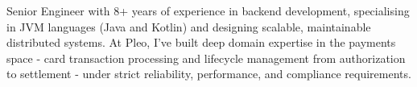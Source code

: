 

\begin{cvparagraph}
	
	Senior Engineer with 8+ years of experience in backend development, specialising in JVM languages (Java and Kotlin) and designing scalable, maintainable distributed systems.
	At Pleo, I've built deep domain expertise in the payments space - card transaction processing and lifecycle management from authorization to settlement - under strict reliability, performance, and compliance requirements.

\end{cvparagraph}